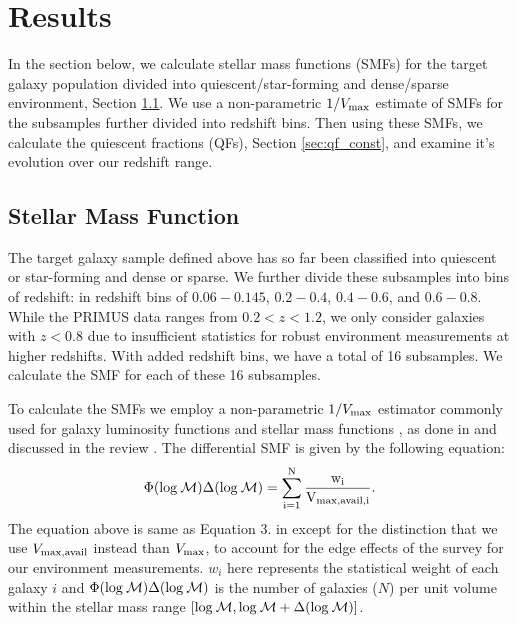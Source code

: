 \documentclass{emulateapj}
\begin{document}
\section{Results}
In the section below, we calculate stellar mass functions (SMFs) for the target galaxy population divided into 
quiescent/star-forming and dense/sparse environment, Section \ref{sec:smf_const}. We use a non-parametric 
$1/V_{\rm{max}}$ estimate of SMFs for the subsamples further divided into redshift bins. Then using these 
SMFs, we calculate the quiescent fractions (QFs), Section \ref{sec:qf_const}, 
and examine it's evolution over our redshift range. 

\subsection{Stellar Mass Function} \label{sec:smf_const}
The target galaxy sample defined above has so far
been classified into quiescent or star-forming and 
dense or sparse. We further divide these subsamples 
into bins of redshift:  in redshift bins of $0.06-0.145$, 
$0.2-0.4$, $0.4-0.6$, and $0.6-0.8$. While the 
PRIMUS data ranges from $0.2 < z < 1.2$, we only 
consider galaxies with $ z<0.8$ due to insufficient
statistics for robust environment measurements at 
higher redshifts. With added redshift bins, we have a
total of 16 subsamples. We calculate the SMF for 
each of these 16 subsamples. 

To calculate the SMFs we employ a non-parametric 
$1/{V_{\rm{max}}}$ estimator commonly used for 
galaxy luminosity functions and stellar mass functions
, as done in \cite{Moustakas:2013aa} and discussed 
in the review \cite{Johnston:2011aa}. The differential 
SMF is given by the following equation:
\begin{equation} \label{eq:phi}
\Phi(\rm{log}\: \mathcal{M}) \Delta(\rm{log} \:\mathcal{M}) = \sum\limits_{i=1}^{N} \frac{w_i}{V_{\rm{max,avail},i}}. 
\end{equation}
The equation above is same as Equation 3. in 
\cite{Moustakas:2013aa} except for the distinction that 
we use $V_{\rm{max,avail}}$ instead than $V_{\rm{max}}$, 
to account for the edge effects of the survey for our
environment measurements. $w_i$ here represents 
the statistical weight of each galaxy $i$ and 
$\Phi(\rm{log}\: \mathcal{M}) \Delta(\rm{log}\: \mathcal{M})$ 
is the number of galaxies ($N$) per unit volume within the 
stellar mass range 
$[\rm{log} \:\mathcal{M}, \rm{log} \:\mathcal{M}+\Delta(\rm{log} \:\mathcal{M})]$.
\end{document}
